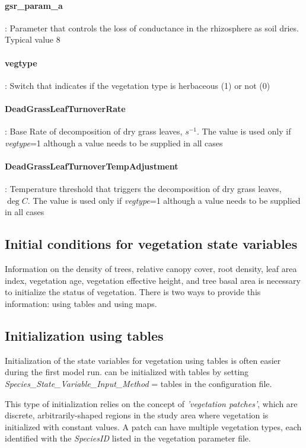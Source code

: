 \paragraph{gsr\_param\_a}: Parameter that controls the loss of conductance in the rhizosphere as soil dries. Typical value 8

\hangindent=0.7cm
\paragraph{vegtype}: Switch that indicates if the vegetation type is herbaceous (1) or not (0)

\hangindent=0.7cm
\paragraph{DeadGrassLeafTurnoverRate}: Base Rate of decomposition of dry grass leaves,  $s^{-1}$. The value is used only if \emph{vegtype}=1 although a value needs to be supplied in all cases 

\hangindent=0.7cm
\paragraph{DeadGrassLeafTurnoverTempAdjustment}: Temperature threshold that triggers the decomposition of dry grass leaves,  $\deg C$. The value is used only if \emph{vegtype}=1 although a value needs to be supplied in all cases    
 

\subsection{Initial conditions for vegetation state variables}

Information on the density of trees, relative canopy cover, root density, leaf area index, vegetation age, vegetation effective height, and tree basal area is necessary to initialize the status of vegetation. There is two ways to provide this information: using tables and using maps. 

\subsection{Initialization using tables}
Initialization of the state variables for vegetation using tables is often easier during the first model run. \echo can be initialized with tables by setting \emph{Species\_State\_Variable\_Input\_Method} = tables in the configuration file. 

This type of initialization relies on the concept of \textit{'vegetation patches'}, which are discrete, arbitrarily-shaped regions in the study area where vegetation is initialized with constant values. A patch can have multiple vegetation types, each identified with the \emph{SpeciesID} listed in the vegetation parameter file.

